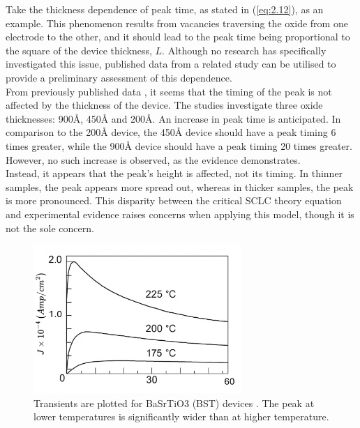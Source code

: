 \noindent Take the thickness dependence of peak time, as stated in (\ref{eq:2.12}), as an example. This phenomenon results from vacancies traversing the oxide from one electrode to the other, and it should lead to the peak time being proportional to the square of the device thickness, $L$. Although no research has specifically investigated this issue, published data from a related study can be utilised to provide a preliminary assessment of this dependence.\\

\noindent From previously published data \cite{manceau2007current}, it seems that the timing of the peak is not affected by the thickness of the device. The studies investigate three oxide thicknesses: 900\r{A}, 450\r{A} and 200\r{A}. An increase in peak time is anticipated. In comparison to the 200\r{A} device, the 450\r{A} device should have a peak timing 6 times greater, while the 900\r{A} device should have a peak timing 20 times greater. However, no such increase is observed, as the evidence demonstrates.\\

\noindent Instead, it appears that the peak's height is affected, not its timing. In thinner samples, the peak appears more spread out, whereas in thicker samples, the peak is more pronounced. This disparity between the critical SCLC theory equation and experimental evidence raises concerns when applying this model, though it is not the sole concern.\\

\begin{figure}[htbp!] 
    \centering    
    \includegraphics[width=0.7\textwidth]{Chapter4/Figs/b.png}
    \caption[Transient's peak identification]{Transients are plotted for BaSrTiO3 (BST) devices \cite{boikov2002near}. The peak at lower temperatures is significantly wider than at higher temperature.}
    \label{fig:4b}
\end{figure}
    
